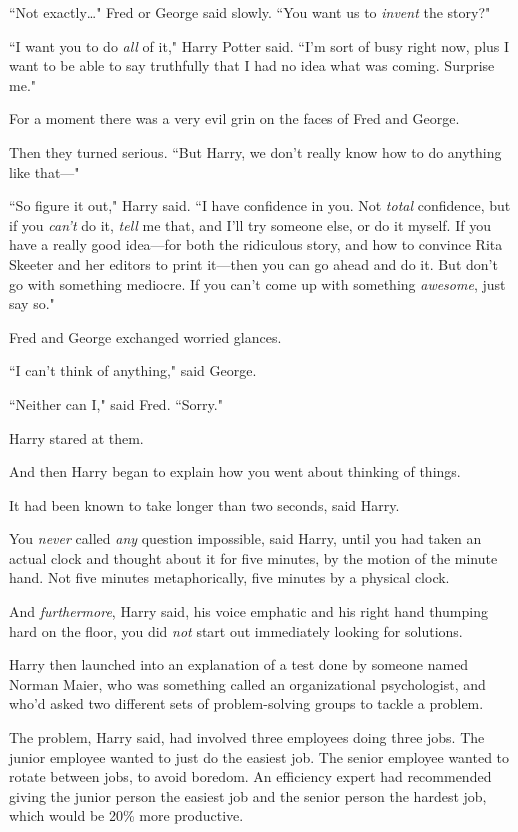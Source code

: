 ``Not exactly{\ldots}" Fred or George said slowly. ``You want us to \emph{invent} the story?"

``I want you to do \emph{all} of it," Harry Potter said. ``I'm sort of busy right now, plus I want to be able to say truthfully that I had no idea what was coming. Surprise me."

For a moment there was a very evil grin on the faces of Fred and George.

Then they turned serious. ``But Harry, we don't really know how to do anything like that—"

``So figure it out," Harry said. ``I have confidence in you. Not \emph{total} confidence, but if you \emph{can't} do it, \emph{tell} me that, and I'll try someone else, or do it myself. If you have a really good idea—for both the ridiculous story, and how to convince Rita Skeeter and her editors to print it—then you can go ahead and do it. But don't go with something mediocre. If you can't come up with something \emph{awesome}, just say so."

Fred and George exchanged worried glances.

``I can't think of anything," said George.

``Neither can I," said Fred. ``Sorry."

Harry stared at them.

And then Harry began to explain how you went about thinking of things.

It had been known to take longer than two seconds, said Harry.

You \emph{never} called \emph{any} question impossible, said Harry, until you had taken an actual clock and thought about it for five minutes, by the motion of the minute hand. Not five minutes metaphorically, five minutes by a physical clock.

And \emph{furthermore}, Harry said, his voice emphatic and his right hand thumping hard on the floor, you did \emph{not} start out immediately looking for solutions.

Harry then launched into an explanation of a test done by someone named Norman Maier, who was something called an organizational psychologist, and who'd asked two different sets of problem-solving groups to tackle a problem.

The problem, Harry said, had involved three employees doing three jobs. The junior employee wanted to just do the easiest job. The senior employee wanted to rotate between jobs, to avoid boredom. An efficiency expert had recommended giving the junior person the easiest job and the senior person the hardest job, which would be 20\% more productive.

